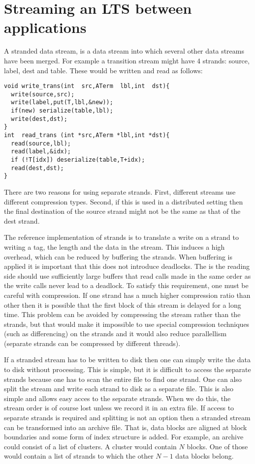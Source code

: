 \documentclass{article}
\begin{document}
\section{Streaming an LTS between applications}


A stranded data stream, is a data stream into which several other
data streams have been merged. For example a transition stream
might have 4 strands: source, label, dest and table.
These would be written and read as follows:

\begin{verbatim}
void write_trans(int  src,ATerm  lbl,int  dst){
  write(source,src);
  write(label,put(T,lbl,&new));
  if(new) serialize(table,lbl);
  write(dest,dst);
}
int  read_trans (int *src,ATerm *lbl,int *dst){
  read(source,lbl);
  read(label,&idx);
  if (!T[idx]) deserialize(table,T+idx);
  read(dest,dst);
}
\end{verbatim}

There are two reasons for using separate strands. First, different streams use different compression
types. Second, if this is used in a distributed setting then the final destination of
the source strand might not be the same as that of the dest strand.

The reference implementation of strands is to translate a write on a strand to 
writing a tag, the length and the data in the stream. This induces a high overhead,
which can be reduced by buffering the strands. When buffering is applied it is important
that this does not introduce deadlocks. The is the reading side should use sufficiently large
buffers that read calls made in the same order as the write calls never lead to a deadlock.
To satisfy this requirement, one must be careful with compression. If one strand has a much higher compression ratio
than other then it is possible that the first block of this stream is delayed for a long time.
This problem can be avoided by compressing the stream rather than the strands, but 
that would make it impossible to use special compression techniques (such as differencing)
on the strands and it would also reduce parallellism (separate strands can be compressed by different threads).

\bigskip

If a stranded stream has to be written to disk then one can simply write the
data to disk without processing. This is simple, but it is difficult to access
the separate strands because one has to scan the entire file to find one strand.
One can also split the stream and write each strand to disk as a separate file.
This is also simple and allows easy acces to the separate strands.
When we do this, the stream order is of course lost unless we record it
in an extra file.
If access to separate strands is required and splitting is not an option then
a stranded stream can be transformed into an archive file. That is, data blocks
are aligned at block boundaries and some form of index structure is added.
For example, an archive could consist of a list of clusters.
A cluster would contain $N$ blocks. One of those would contain a list of
strands to which the other $N-1$ data blocks belong.
\end{document}
